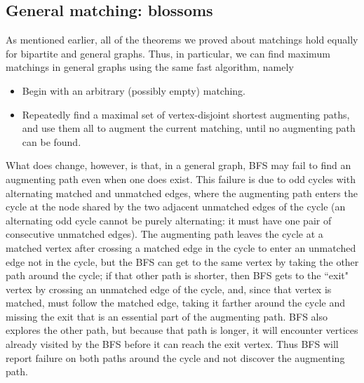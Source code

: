 \documentclass[11pt]{article}
\begin{document}
\subsection{General matching: blossoms}
As mentioned earlier, all of the theorems we proved about matchings hold equally
for bipartite and general graphs.  Thus, in particular, we can find maximum
matchings in general graphs using the same fast algorithm, namely
\begin{itemize}
  \item
    Begin with an arbitrary (possibly empty) matching.
  \item
    Repeatedly find a maximal set of vertex-disjoint shortest augmenting paths,
    and use them all to augment the current matching,
    until no augmenting path can be found.
\end{itemize}
What does change, however, is that, in a general graph, BFS may fail to
find an augmenting path even when one does exist.  This failure is due
to odd cycles with alternating matched and unmatched edges, where the
augmenting path enters the cycle at the node shared by the two adjacent
unmatched edges of the cycle (an alternating odd cycle cannot be purely
alternating: it must have one pair of consecutive unmatched edges).
The augmenting path leaves the cycle at a matched vertex after crossing
a matched edge in the cycle to enter an unmatched edge not in the cycle,
but the BFS can get to the same vertex by taking the other path around the
cycle; if that other path is shorter, then BFS gets to the ``exit" vertex
by crossing an unmatched edge of the cycle, and, since that vertex is matched,
must follow the matched edge, taking it farther around the cycle and missing
the exit that is an essential part of the augmenting path.  BFS also explores
the other path, but because that path is longer, it will encounter vertices
already visited by the BFS before it can reach the exit vertex.  Thus BFS
will report failure on both paths around the cycle and not discover the
augmenting path.
\end{document}
